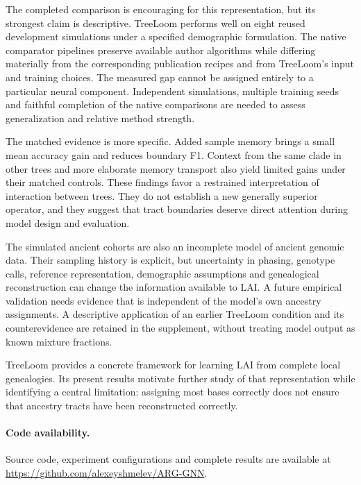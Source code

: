 \documentclass[letterpaper]{article}
\begin{document}
The completed comparison is encouraging for this representation, but its strongest claim is descriptive. TreeLoom performs well on eight reused development simulations under a specified demographic formulation. The native comparator pipelines preserve available author algorithms while differing materially from the corresponding publication recipes and from TreeLoom's input and training choices. The measured gap cannot be assigned entirely to a particular neural component. Independent simulations, multiple training seeds and faithful completion of the native comparisons are needed to assess generalization and relative method strength.

The matched evidence is more specific. Added sample memory brings a small mean accuracy gain and reduces boundary F1. Context from the same clade in other trees and more elaborate memory transport also yield limited gains under their matched controls. These findings favor a restrained interpretation of interaction between trees. They do not establish a new generally superior operator, and they suggest that tract boundaries deserve direct attention during model design and evaluation.

The simulated ancient cohorts are also an incomplete model of ancient genomic data. Their sampling history is explicit, but uncertainty in phasing, genotype calls, reference representation, demographic assumptions and genealogical reconstruction can change the information available to LAI. A future empirical validation needs evidence that is independent of the model's own ancestry assignments. A descriptive application of an earlier TreeLoom condition and its counterevidence are retained in the supplement, without treating model output as known mixture fractions.

TreeLoom provides a concrete framework for learning LAI from complete local genealogies. Its present results motivate further study of that representation while identifying a central limitation: assigning most bases correctly does not ensure that ancestry tracts have been reconstructed correctly.

\paragraph{Code availability.}
Source code, experiment configurations and complete results are available at \url{https://github.com/alexeyshmelev/ARG-GNN}.



\clearpage
\appendix
\end{document}
